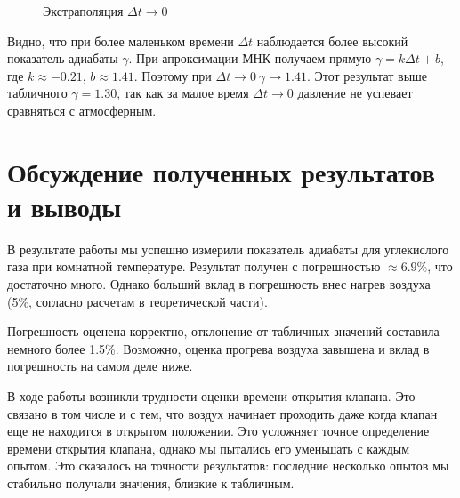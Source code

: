 \documentclass[a4paper,12pt]{report}
\begin{document}
    \begin{figure}[H]
        \centering
        \caption{Экстраполяция $\Delta t \rightarrow 0$}
    \end{figure}
    Видно, что при более маленьком времени $\Delta t$ наблюдается более высокий показатель адиабаты $\gamma$. При апроксимации МНК получаем прямую $\gamma=k\Delta t + b$, где $k\approx-0.21$, $b\approx 1.41$. Поэтому при $\Delta t \rightarrow 0 \ \gamma\rightarrow 1.41$. Этот результат выше табличного $\gamma=1.30$, так как за малое время $\Delta t \rightarrow 0$ давление не успевает сравняться с атмосферным. 
    \section*{Обсуждение полученных результатов и выводы}
    
    В результате работы мы успешно измерили показатель адиабаты для углекислого газа при комнатной температуре. Результат получен с погрешностью $\approx 6.9\%$, что достаточно много. Однако больший вклад в погрешность внес нагрев воздуха (5\%, согласно расчетам в теоретической части).

    Погрешность оценена корректно, отклонение от табличных значений составила немного более 1.5\%. Возможно, оценка прогрева воздуха завышена и вклад в погрешность на самом деле ниже.

    В ходе работы возникли трудности оценки времени открытия клапана. Это связано в том числе и с тем, что воздух начинает проходить даже когда клапан еще не находится в открытом положении. Это усложняет точное определение времени открытия клапана, однако мы пытались его уменьшать с каждым опытом. Это сказалось на точности результатов: последние несколько опытов мы стабильно получали значения, близкие к табличным.
\end{document}
